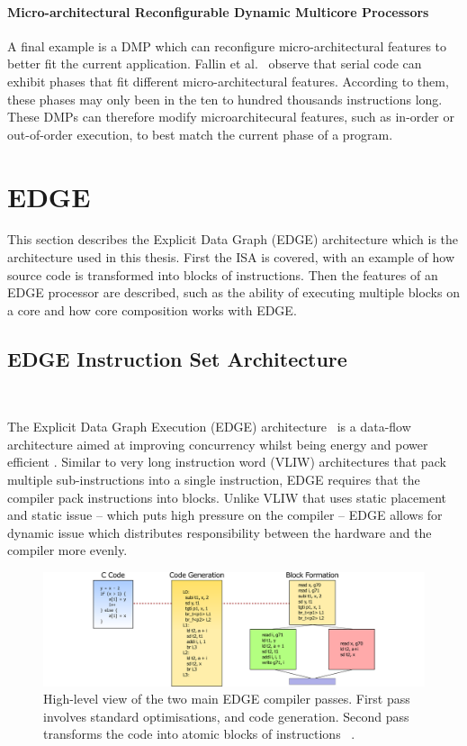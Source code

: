 \paragraph*{Micro-architectural Reconfigurable Dynamic Multicore Processors}
A final example is a DMP which can reconfigure micro-architectural features to better fit the current application.
Fallin et al.~\cite{fallinhetblock2014} observe that serial code can exhibit phases that fit different micro-architectural features.
According to them, these phases may only been in the ten to hundred thousands instructions long.
These DMPs can therefore modify microarchitecural features, such as in-order or out-of-order execution, to best match the current phase of a program.

\section{EDGE}\label{chp:bg:sec:edge}

This section describes the Explicit Data Graph (EDGE) architecture which is the architecture used in this thesis.
First the ISA is covered, with an example of how source code is transformed into blocks of instructions.
Then the features of an EDGE processor are described, such as the ability of executing multiple blocks on a core and how core composition works with EDGE.

\subsection{EDGE Instruction Set Architecture}~\label{sec:edge_isa}

The Explicit Data Graph Execution (EDGE) architecture~\cite{burger04edge} is a data-flow architecture aimed at improving concurrency whilst being energy and power efficient \cite{smith2006edge,burger04edge}.
Similar to very long instruction word (VLIW) architectures that pack multiple sub-instructions into a single instruction, EDGE requires that the compiler pack instructions into blocks.
Unlike VLIW that uses static placement and static issue -- which puts high pressure on the compiler -- EDGE allows for dynamic issue which distributes responsibility between the hardware and the compiler more evenly.

\begin{figure}[t]
    \centering
    \includegraphics[width=1\textwidth]{background/graphics/EDGE_4.pdf}
    \caption{High-level view of the two main EDGE compiler passes. First pass involves standard optimisations, and code generation. Second pass transforms the code into atomic blocks of instructions ~\cite{smith2006edge}.}
    \label{fig:EdgeHigh}
\end{figure}
